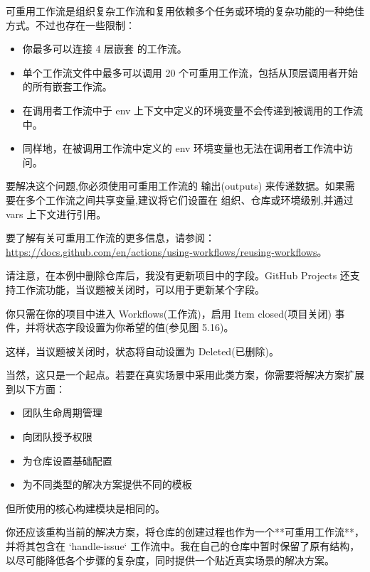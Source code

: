 可重用工作流是组织复杂工作流和复用依赖多个任务或环境的复杂功能的一种绝佳方式。不过也存在一些限制：

\begin{itemize}
\item 
你最多可以连接 4 层嵌套 的工作流。

\item 
单个工作流文件中最多可以调用 20 个可重用工作流，包括从顶层调用者开始的所有嵌套工作流。

\item 
在调用者工作流中于 env 上下文中定义的环境变量不会传递到被调用的工作流中。

\item 
同样地，在被调用工作流中定义的 env 环境变量也无法在调用者工作流中访问。
\end{itemize}

要解决这个问题,你必须使用可重用工作流的 输出(outputs) 来传递数据。如果需要在多个工作流之间共享变量,建议将它们设置在 组织、仓库或环境级别,并通过 vars 上下文进行引用。

要了解有关可重用工作流的更多信息，请参阅：\url{https://docs.github.com/en/actions/using-workflows/reusing-workflows}。

请注意，在本例中删除仓库后，我没有更新项目中的字段。GitHub Projects 还支持工作流功能，当议题被关闭时，可以用于更新某个字段。

你只需在你的项目中进入 Workflows(工作流)，启用 Item closed(项目关闭) 事件，并将状态字段设置为你希望的值(参见图 5.16)。


这样，当议题被关闭时，状态将自动设置为 Deleted(已删除)。


当然，这只是一个起点。若要在真实场景中采用此类方案，你需要将解决方案扩展到以下方面：

\begin{itemize}
\item 
团队生命周期管理

\item 
向团队授予权限

\item 
为仓库设置基础配置

\item 
为不同类型的解决方案提供不同的模板
\end{itemize}

但所使用的核心构建模块是相同的。

你还应该重构当前的解决方案，将仓库的创建过程也作为一个**可重用工作流**，并将其包含在 `handle-issue` 工作流中。我在自己的仓库中暂时保留了原有结构，以尽可能降低各个步骤的复杂度，同时提供一个贴近真实场景的解决方案。



















